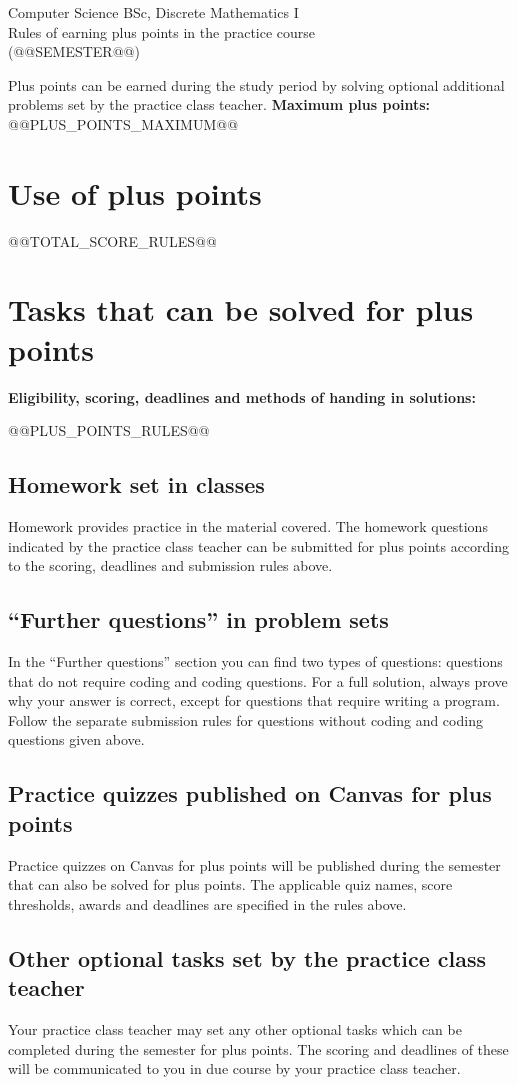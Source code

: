 \documentclass[11pt,a4paper]{article}
\begin{document}
\begin{center}\large
Computer Science BSc, Discrete Mathematics I\\
Rules of earning plus points in the practice course\\
(@@SEMESTER@@)
\end{center}

Plus points can be earned during the study period by solving optional additional
problems set by the practice class teacher.
\textbf{Maximum plus points:} @@PLUS_POINTS_MAXIMUM@@

\section*{Use of plus points}
@@TOTAL_SCORE_RULES@@

\section*{Tasks that can be solved for plus points}
\textbf{Eligibility, scoring, deadlines and methods of handing in solutions:}\par
@@PLUS_POINTS_RULES@@

\subsection*{Homework set in classes}
Homework provides practice in the material covered. The homework questions
indicated by the practice class teacher can be submitted for plus points according
to the scoring, deadlines and submission rules above.

\subsection*{``Further questions'' in problem sets}
In the ``Further questions'' section you can find two types of questions:
questions that do not require coding and coding questions. For a full solution,
always prove why your answer is correct, except for questions that require writing
a program. Follow the separate submission rules for questions without coding and
coding questions given above.

\subsection*{Practice quizzes published on Canvas for plus points}
Practice quizzes on Canvas for plus points will be published during the semester
that can also be solved for plus points. The applicable quiz names, score
thresholds, awards and deadlines are specified in the rules above.

\subsection*{Other optional tasks set by the practice class teacher}
Your practice class teacher may set any other optional tasks which can be completed
during the semester for plus points. The scoring and deadlines of these will be
communicated to you in due course by your practice class teacher.
\end{document}
